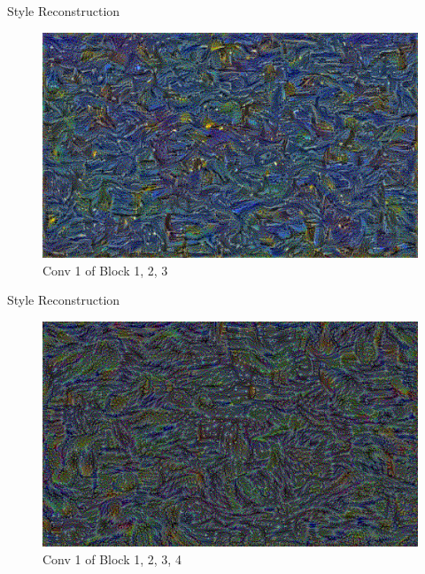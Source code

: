 \documentclass{beamer}
\begin{document}
\begin{frame}{Style Reconstruction}
\begin{figure}[ht]
\centering
\caption{Conv 1 of Block 1, 2, 3}
\includegraphics[width=\textwidth]{img/style/block3_conv1.png}
\end{figure}
\end{frame}

\begin{frame}{Style Reconstruction}
\begin{figure}[ht]
\centering
\caption{Conv 1 of Block 1, 2, 3, 4}
\includegraphics[width=\textwidth]{img/style/block4_conv1.png}
\end{figure}
\end{frame}
\end{document}
